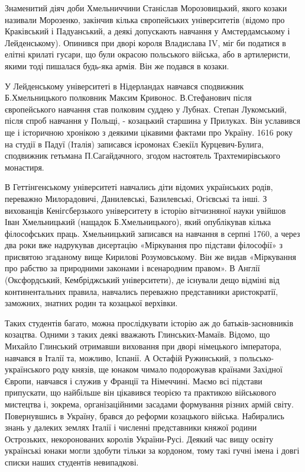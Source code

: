Знаменитий діяч доби Хмельниччини Станіслав Морозовицький, якого козаки
називали Морозенко, закінчив кілька європейських університетів (відомо про
Краківський і Падуанський, а деякі допускають навчання у  Амстердамському і
Лейденському). Опинився при дворі короля Владислава IV, міг би податися в
елітні крилаті гусари, що були окрасою польського війська, або в артилеристи,
якими тоді пишалася будь-яка армія. Він же подався в козаки. 

У Лейденському університеті в Нідерландах навчався сподвижник Б.Хмельницького
полковник Максим Кривонос. В.Стефанович після європейського навчання став
полковим суддею у Лубнах. Степан Лукомський, після спроб навчання у Польщі, -
козацький старшина у Прилуках. Він уславився ще і історичною хронікою з деякими
цікавими фактами про Україну. 1616 року на студії в Падуї (Італія) записався
ієромонах Єзекіїл Курцевич-Булига, сподвижник гетьмана П.Сагайдачного, згодом
настоятель Трахтемирівського монастиря.

В Геттінгенському університеті навчались діти відомих українських родів,
переважно Милорадовичі, Данилевські, Базилевські, Огієвські та інші. З
вихованців Кенігсберзького університету в історію вітчизняної науки увійшов
Іван Хмельницький (нащадок Б.Хмельницького), який опублікував кілька
філософських праць. Хмельницький записався на навчання в серпні 1760, а через
два роки вже надрукував дисертацію «Міркування про підстави філософії» з
присвятою згаданому вище Кирилові Розумовському. Він же видав «Міркування про
рабство за природними законами і всенародним правом». В Англії (Оксфордський,
Кембріджський університети), де існували дещо відміні від континентальних
правила,  навчались  переважно представники аристократії, заможних, знатних
родин та козацької верхівки.

Таких студентів багато, можна прослідкувати історію аж до батьків-засновників
козацтва. Одними з таких деякі вважають Глинських-Мамаїв. Відомо, що Михайло
Глинський отримавши виховання при дворі німецького імператора, навчався в
Італії та, можливо, Іспанії. А Остафій Ружинський, з польсько-українського роду
князів, ще юнаком чимало подорожував країнами Західної Європи, навчався і
служив у Франції та Німеччині. Маємо всі підстави припускати, що найбільше він
цікавився теорією та практикою військового мистецтва і, зокрема,
організаційними засадами формування різних армій світу. Повернувшись в Україну,
брався до реформи козацького війська. Набирались знань у далеких землях Італії
і численні представники княжої родини Острозьких, некоронованих королів
України-Русі. Деякий час вищу освіту українські юнаки могли здобути тільки за
кордоном, тому такі гучні імена і довгі списки наших студентів невипадкові. 

